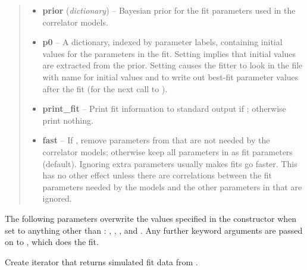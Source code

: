 \documentclass[letterpaper,10pt,english]{sphinxmanual}
\begin{document}
\begin{fulllineitems}
\begin{fulllineitems}
\begin{quote}
\begin{description}
\begin{itemize}
\item {} 
\textbf{prior} (\emph{dictionary}) -- Bayesian prior for the fit parameters used in the 
correlator models.

\item {} 
\textbf{p0} -- A dictionary, indexed by parameter labels, containing 
initial values for the parameters in the fit. Setting
 implies that initial values are extracted from the
prior. Setting  causes the fitter to look in
the file with name  for initial values and to
write out best-fit parameter values after the fit (for the next
call to ).

\item {} 
\textbf{print\_fit} -- Print fit information to standard output if 
; otherwise print nothing.

\item {} 
\textbf{fast} -- If , remove parameters from  that are 
not needed by the correlator models; otherwise keep all 
parameters in  as fit parameters (default). 
Ignoring extra parameters usually makes fits go faster.
This has no other effect unless there are correlations between the 
fit parameters needed by the models and the other parameters in 
 that are ignored.

\end{itemize}

\end{description}\end{quote}

The following parameters overwrite the values specified in the
{\hyperref[corrfitter:corrfitter.CorrFitter]{}} constructor when set to anything other than :
, , , and . Any
further keyword arguments are passed on to
, which does the fit.

\end{fulllineitems}


\begin{fulllineitems}
\label{corrfitter:corrfitter.CorrFitter.simulated_data_iter}
Create iterator that returns simulated fit data from .


\end{fulllineitems}
\end{fulllineitems}
\end{document}
